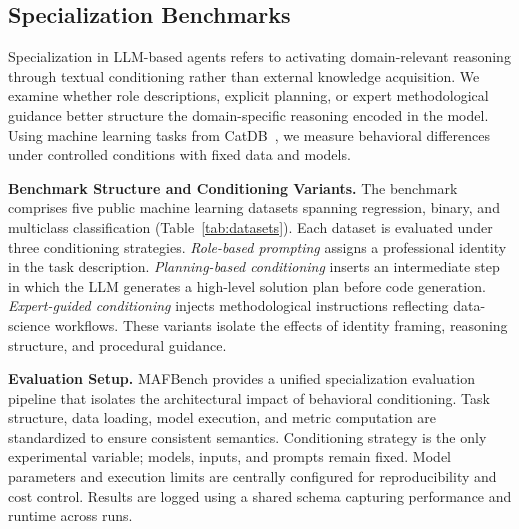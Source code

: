 


\vspace{-2mm}
\subsection{Specialization Benchmarks}
\label{subsec:bench_specialization}

Specialization in LLM-based agents refers to activating domain-relevant reasoning through textual conditioning rather than external knowledge acquisition. We examine whether role descriptions, explicit planning, or expert methodological guidance better structure the domain-specific reasoning encoded in the model. Using machine learning tasks from CatDB~\cite{catdb}, we measure behavioral differences under controlled conditions with fixed data and models.


\noindent\textbf{Benchmark Structure and Conditioning Variants.}
The benchmark comprises five public machine learning datasets spanning regression, binary, and multiclass classification (Table~\ref{tab:datasets}). Each dataset is evaluated under three conditioning strategies. \emph{Role-based prompting} assigns a professional identity in the task description. \emph{Planning-based conditioning} inserts an intermediate step in which the LLM generates a high-level solution plan before code generation. \emph{Expert-guided conditioning} injects methodological instructions reflecting data-science workflows. These variants isolate the effects of identity framing, reasoning structure, and procedural guidance.

\noindent\textbf{Evaluation Setup.}
MAFBench provides a unified specialization evaluation pipeline that isolates the architectural impact of behavioral conditioning. Task structure, data loading, model execution, and metric computation are standardized to ensure consistent semantics. Conditioning strategy is the only experimental variable; models, inputs, and prompts remain fixed. Model parameters and execution limits are centrally configured for reproducibility and cost control. Results are logged using a shared schema capturing performance and runtime across runs.




